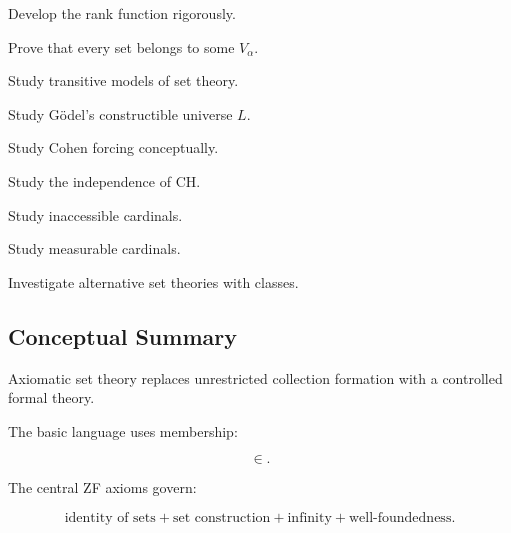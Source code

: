 \begin{exercise}[4]
Develop the rank function rigorously.
\end{exercise}

\begin{exercise}[4]
Prove that every set belongs to some \(V_\alpha\).
\end{exercise}

\begin{exercise}[4]
Study transitive models of set theory.
\end{exercise}

\begin{exercise}[4]
Study Gödel's constructible universe \(L\).
\end{exercise}

\begin{exercise}[4]
Study Cohen forcing conceptually.
\end{exercise}

\begin{exercise}[4]
Study the independence of CH.
\end{exercise}

\begin{exercise}[4]
Study inaccessible cardinals.
\end{exercise}

\begin{exercise}[4]
Study measurable cardinals.
\end{exercise}

\begin{exercise}[4]
Investigate alternative set theories with classes.
\end{exercise}

\subsection{Conceptual Summary}
\label{subsec:axiomatic-set-theory-summary}

Axiomatic set theory replaces unrestricted collection formation with a
controlled formal theory.

The basic language uses membership:

\[
\boxed{
\in.
}
\]

The central ZF axioms govern:

\[
\boxed{
\text{identity of sets}
+
\text{set construction}
+
\text{infinity}
+
\text{well-foundedness}.
}
\]


